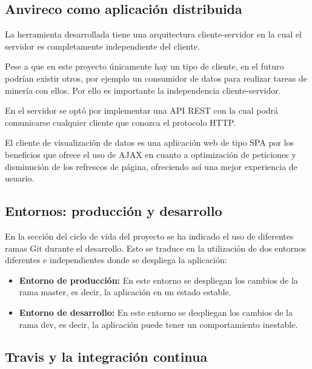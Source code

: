 \subsection{Anvireco como aplicación distribuida}

La herramienta desarrollada tiene una arquitectura cliente-servidor en la cual el servidor es completamente independiente del cliente.

Pese a que en este proyecto únicamente hay un tipo de cliente, en el futuro podrían existir otros, por ejemplo un consumidor de datos para realizar tareas de minería con ellos. Por ello es importante la independencia cliente-servidor.


En el servidor se optó por implementar una API REST con la cual podrá comunicarse cualquier cliente que conozca el protocolo HTTP.

El cliente de visualización de datos es una aplicación web de tipo SPA por los beneficios que ofrece el uso de AJAX en cuanto a optimización de peticiones y disminución de los refrescos de página, ofreciendo así una mejor experiencia de usuario.


\subsection{Entornos: producción y desarrollo}

En la sección del ciclo de vida del proyecto se ha indicado el uso de diferentes ramas Git durante el desarrollo. Esto se traduce en la utilización de dos entornos diferentes e independientes donde se despliega la aplicación:

\begin{itemize}
	\item \textbf{Entorno de producción:} En este entorno se despliegan los cambios de la rama master, es decir, la aplicación en un estado estable.
	\item \textbf{Entorno de desarrollo:} En este entorno se despliegan los cambios de la rama dev, es decir, la aplicación puede tener un comportamiento inestable.
\end{itemize}



\subsection{Travis y la integración continua}

